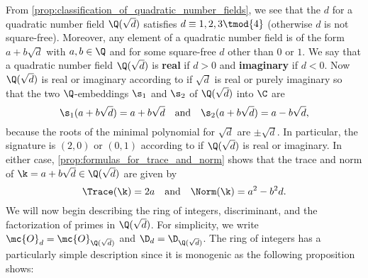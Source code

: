     From \cref{prop:classification_of_quadratic_number_fields}, we see that the $d$ for a quadratic number field $\Q(\sqrt{d})$ satisfies $d \equiv 1,2,3 \tmod{4}$ (otherwise $d$ is not square-free). Moreover, any element of a quadratic number field is of the form $a+b\sqrt{d}$ with $a,b \in \Q$ and for some square-free $d$ other than $0$ or $1$. We say that a quadratic number field $\Q(\sqrt{d})$ is \textbf{real} if $d > 0$ and \textbf{imaginary} if $d < 0$. Now $\Q(\sqrt{d})$ is real or imaginary according to if $\sqrt{d}$ is real or purely imaginary so that the two $\Q$-embeddings $\s_{1}$ and $\s_{2}$ of $\Q(\sqrt{d})$ into $\C$ are
    \[
      \s_{1}(a+b\sqrt{d}) = a+b\sqrt{d} \quad \text{and} \quad \s_{2}(a+b\sqrt{d}) = a-b\sqrt{d},
    \]
    because the roots of the minimal polynomial for $\sqrt{d}$ are $\pm\sqrt{d}$. In particular, the signature is $(2,0)$ or $(0,1)$ according to if $\Q(\sqrt{d})$ is real or imaginary. In either case, \cref{prop:formulas_for_trace_and_norm} shows that the trace and norm of $\k = a+b\sqrt{d} \in \Q(\sqrt{d})$ are given by
    \[
      \Trace(\k) = 2a \quad \text{and} \quad \Norm(\k) = a^{2}-b^{2}d.
    \]
    We will now begin describing the ring of integers, discriminant, and the factorization of primes in $\Q(\sqrt{d})$. For simplicity, we write $\mc{O}_{d} = \mc{O}_{\Q(\sqrt{d})}$ and $\D_{d} = \D_{\Q(\sqrt{d})}$. The ring of integers has a particularly simple description since it is monogenic as the following proposition shows:
    
